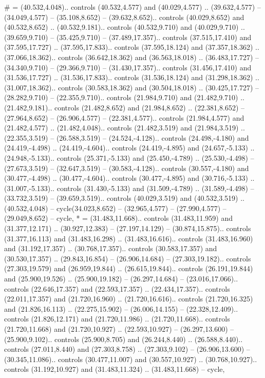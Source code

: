 {\#} = {(40.532,4.048).. controls (40.532,4.577) and (40.029,4.577) .. (39.632,4.577) -- (34.049,4.577) -- (35.108,8.652) -- (39.632,8.652).. controls (40.029,8.652) and (40.532,8.652) .. (40.532,9.181).. controls (40.532,9.710) and (40.029,9.710) .. (39.659,9.710) -- (35.425,9.710) -- (37.489,17.357).. controls (37.515,17.410) and (37.595,17.727) .. (37.595,17.833).. controls (37.595,18.124) and (37.357,18.362) .. (37.066,18.362).. controls (36.642,18.362) and (36.563,18.018) .. (36.483,17.727) -- (34.340,9.710) -- (29.366,9.710) -- (31.430,17.357).. controls (31.456,17.410) and (31.536,17.727) .. (31.536,17.833).. controls (31.536,18.124) and (31.298,18.362) .. (31.007,18.362).. controls (30.583,18.362) and (30.504,18.018) .. (30.425,17.727) -- (28.282,9.710) -- (22.355,9.710).. controls (21.984,9.710) and (21.482,9.710) .. (21.482,9.181).. controls (21.482,8.652) and (21.984,8.652) .. (22.381,8.652) -- (27.964,8.652) -- (26.906,4.577) -- (22.381,4.577).. controls (21.984,4.577) and (21.482,4.577) .. (21.482,4.048).. controls (21.482,3.519) and (21.984,3.519) .. (22.355,3.519) -- (26.588,3.519) -- (24.524,-4.128).. controls (24.498,-4.180) and (24.419,-4.498) .. (24.419,-4.604).. controls (24.419,-4.895) and (24.657,-5.133) .. (24.948,-5.133).. controls (25.371,-5.133) and (25.450,-4.789) .. (25.530,-4.498) -- (27.673,3.519) -- (32.647,3.519) -- (30.583,-4.128).. controls (30.557,-4.180) and (30.477,-4.498) .. (30.477,-4.604).. controls (30.477,-4.895) and (30.716,-5.133) .. (31.007,-5.133).. controls (31.430,-5.133) and (31.509,-4.789) .. (31.589,-4.498) -- (33.732,3.519) -- (39.659,3.519).. controls (40.029,3.519) and (40.532,3.519) .. (40.532,4.048) -- cycle(34.023,8.652) -- (32.965,4.577) -- (27.990,4.577) -- (29.049,8.652) -- cycle},
{*} = {(31.483,11.668).. controls (31.483,11.959) and (31.377,12.171) .. (30.927,12.383) -- (27.197,14.129) -- (30.874,15.875).. controls (31.377,16.113) and (31.483,16.298) .. (31.483,16.616).. controls (31.483,16.960) and (31.192,17.357) .. (30.768,17.357).. controls (30.583,17.357) and (30.530,17.357) .. (29.843,16.854) -- (26.906,14.684) -- (27.303,19.182).. controls (27.303,19.579) and (26.959,19.844) .. (26.615,19.844).. controls (26.191,19.844) and (25.900,19.526) .. (25.900,19.182) -- (26.297,14.684) -- (23.016,17.066).. controls (22.646,17.357) and (22.593,17.357) .. (22.434,17.357).. controls (22.011,17.357) and (21.720,16.960) .. (21.720,16.616).. controls (21.720,16.325) and (21.826,16.113) .. (22.275,15.902) -- (26.006,14.155) -- (22.328,12.409).. controls (21.826,12.171) and (21.720,11.986) .. (21.720,11.668).. controls (21.720,11.668) and (21.720,10.927) .. (22.593,10.927) -- (26.297,13.600) -- (25.900,9.102).. controls (25.900,8.705) and (26.244,8.440) .. (26.588,8.440).. controls (27.011,8.440) and (27.303,8.758) .. (27.303,9.102) -- (26.906,13.600) -- (30.345,11.086).. controls (30.477,11.007) and (30.557,10.927) .. (30.768,10.927).. controls (31.192,10.927) and (31.483,11.324) .. (31.483,11.668) -- cycle},
